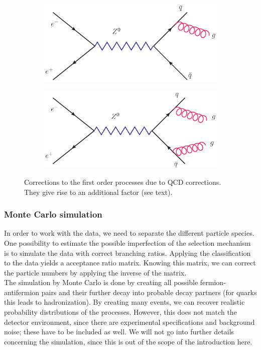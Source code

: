 \begin{figure}[htpb]
\centering
\begin{subfigure}{.5\textwidth}
  \centering
  \includegraphics[width=1.0\linewidth]{figures/QCD1}
  \label{fig:sub1}
\end{subfigure}%
\begin{subfigure}{.5\textwidth}
  \centering
  \includegraphics[width=1.0\linewidth]{figures/QCD2}
  \label{fig:sub2}
\end{subfigure}
\caption{Corrections to the first order processes due to QCD corrections. They give rise to an additional factor
(see text).}
\label{fig:QCD_corr}
\end{figure}

\subsubsection{Monte Carlo simulation}
\label{sub:monte_carlo_simulation}
In order to work with the data, we need to separate the different particle species. One possibility to estimate the 
possible imperfection of the selection mechanism is to simulate the data with correct branching ratios. Applying the 
classification to the data yields a acceptance ratio matrix. Knowing this matrix, we can correct the particle numbers
by applying the inverse of the matrix. \\
The simulation by Monte Carlo is done by creating all possible fermion-antifermion pairs and their further decay into
probable decay partners (for quarks this leads to hadronization). By creating many events, we can recover realistic 
probability distributions of the processes. However, this does not match the detector environment, since there are experimental
specifications and background noise; these have to be included as well. We will not go into further details concerning 
the simulation, since this is out of the scope of the introduction here. 



